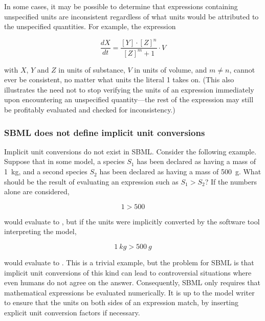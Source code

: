 In some cases, it may be possible to determine that expressions
containing unspecified units are inconsistent regardless of what
units would be attributed to the unspecified quantities.  For
example, the expression
\begin{linenomath}
  \begin{equation*}
    \frac{dX}{dt} = \frac{[Y] \cdot [Z]^n}{[Z]^m + 1} \cdot V
  \end{equation*}
\end{linenomath}
with $X$, $Y$ and $Z$ in units of substance, $V$ in
units of volume, and $m \neq n$, cannot ever be consistent, no
matter what units the literal 1 takes on.  (This also illustrates
the need not to stop verifying the units of an expression
immediately upon encountering an unspecified quantity---the rest
of the expression may still be profitably evaluated and checked
for inconsistency.)


\subsubsection{SBML does not define implicit unit conversions}
\label{sec:no-implicit-conversions}

Implicit unit conversions do not exist in SBML.  Consider the
following example.  Suppose that in some model, a species $S_1$
has been declared as having a mass of 1~kg, and a second species
$S_2$ has been declared as having a mass of 500~g.  What should be
the result of evaluating an expression such as $S_1 > S_2$?  If
the numbers alone are considered,
\begin{linenomath}
  \begin{equation*}
    1 > 500
  \end{equation*}
\end{linenomath}
would evaluate to , but if the units were implicitly
converted by the software tool interpreting the model,
\begin{linenomath}
  \begin{equation*}
    1~kg > 500~g
  \end{equation*}
\end{linenomath}
would evaluate to .  This is a trivial example, but the
problem for SBML is that implicit unit conversions of this kind
can lead to controversial situations where even humans do not
agree on the answer.  Consequently, SBML only requires that
mathematical expressions be evaluated numerically.  It is up to
the model writer to ensure that the units on both sides of an
expression match, by inserting explicit unit conversion factors if
necessary.

